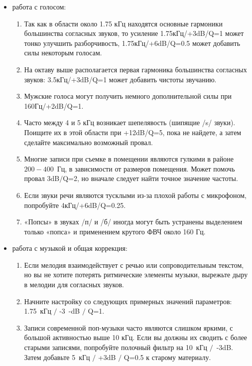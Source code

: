 \documentclass[oneside, final, 14pt]{extreport}
\begin{document}

\begin{itemize}
  \item работа с голосом:
  \begin{enumerate}
    \item Так как в области около 1.75 кГц находятся основные гармоники большинства согласных звуков, то усиление 1.75кГц/+3dB/Q=1 может тонко улучшить разборчивость, 1.75кГц/+6dB/Q=0.5 может добавить силы некоторым голосам.
    \item На октаву выше располагается первая гармоника большинства согласных звуков: 3.5кГц/+3dB/Q=1 может добавить чистоты звучанию.
    \item Мужские голоса могут получить немного дополнительной силы при 160Гц/+2dB/Q=1.
    \item Часто между 4 и 5 кГц возникает шепелявость (шипящие /s/ звуки). Поищите их в этой области при +12dB/Q=5, пока не найдете, а затем сделайте максимально возможный провал.
    \item Многие записи при съемке в помещении являются гулкими в районе $200-400$~Гц, в зависимости от размеров помещения. Может помочь провал 3dB$/$Q=2, но вначале следует найти точное значение частоты.
    \item Если звуки речи являются тусклыми из-за плохой работы с микрофоном, попробуйте 4кГц/+6dB/Q=0.25.
    \item «Попсы» в звуках /п/ и /б/ иногда могут быть устранены выделением только «попса» и применением крутого ФВЧ около 160 Гц.
  \end{enumerate}
  \item работа с музыкой и общая коррекция:
  \begin{enumerate}
    \item Если мелодия взаимодействует с речью или сопроводительным текстом, но вы не хотите потерять ритмические элементы музыки, вырежьте дыру в мелодии для согласных звуков.
    \item Начните настройку со следующих примерных значений параметров: 1.75~кГц $/$ -3~-dB $/$ Q=1.
    \item Записи современной поп-музыки часто являются слишком яркими, с большой активностью выше 10 кГц. Если вы должны их сводить с более старыми записями, попробуйте полочный фильтр на 10~кГц $/$~-3dB. Затем добавьте 5~кГц $/$ +3dB $/$ Q=0.5 к старому материалу.

\end{enumerate}
\end{itemize}
\end{document}
